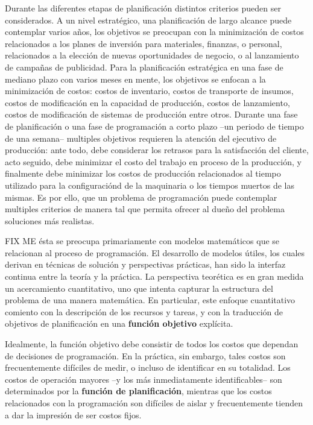 \documentclass[draft,12pt,headsepline,footsepline,paper=letter]{scrreprt}
\begin{document}
Durante las diferentes etapas de planificación distintos criterios pueden ser considerados. A un nivel estratégico, una planificación de largo alcance puede contemplar varios años, los objetivos se preocupan con la minimización de costos relacionados a los planes de inversión para materiales, finanzas, o personal, relacionados a la elección de nuevas oportunidades de negocio, o al lanzamiento de campañas de publicidad. Para la planificación estratégica en una fase de mediano plazo con varios meses en mente, los objetivos se enfocan a la minimización de costos: costos de inventario, costos de transporte de insumos, costos de modificación en la capacidad de producción, costos de lanzamiento, costos de modificación de sistemas de producción entre otros. Durante una fase de planificación o una fase de programación a corto plazo –un periodo de tiempo de una semana– multiples objetivos requieren la atención del ejecutivo de producción: ante todo, debe considerar los retrasos para la satisfacción del cliente, acto seguido, debe minimizar el costo del trabajo en proceso de la producción, y finalmente debe minimizar los costos de producción relacionados al tiempo utilizado para la configuraciónd de la maquinaria o los tiempos muertos de las mismas. Es por ello, que un problema de programación puede contemplar multiples criterios de manera tal que permita ofrecer al dueño del problema soluciones más realistas\citep[p.~1]{TKindt2002}.

FIX ME
ésta se preocupa primariamente con modelos matemáticos que se relacionan al proceso de programación. El desarrollo de modelos útiles, los cuales derivan en técnicas de solución y perspectivas prácticas, han sido la interfaz continua entre la teoría y la práctica. 
%
La perspectiva teorética es en gran medida un acercamiento cuantitativo, uno que intenta capturar la estructura del problema de una manera matemática.
%
En particular, este enfoque cuantitativo comiento con la descripción de los recursos y tareas, y con la traducción de objetivos de planificación en una \textbf{función objetivo} explícita.

Idealmente, la función objetivo debe consistir de todos los costos que dependan de decisiones de programación. En la práctica, sin embargo, tales costos son frecuentemente difíciles de medir, o incluso de identificar en su totalidad. Los costos de operación mayores –y los más inmediatamente identificables– son determinados por la \textbf{función de planificación}, mientras que los costos relacionados con la programación son difíciles de aislar y frecuentemente tienden a dar la impresión de ser costos fijos.
\end{document}
